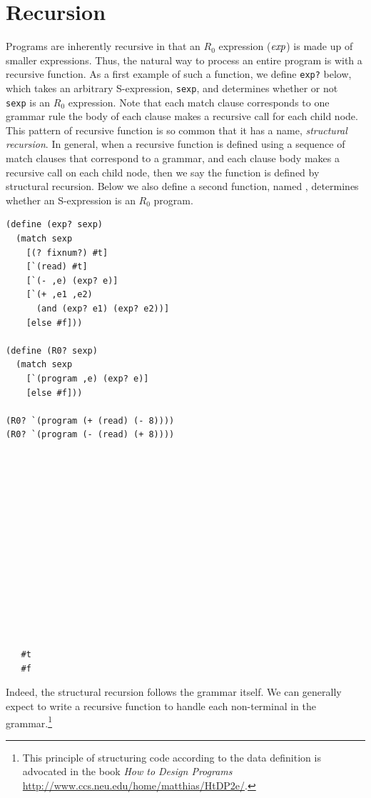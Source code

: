 \documentclass[11pt]{book}
\begin{document}
\section{Recursion}
\label{sec:recursion}

Programs are inherently recursive in that an $R_0$ expression ($\mathit{exp}$)
is made up of smaller expressions. Thus, the natural way to process an
entire program is with a recursive function.  As a first example of
such a function, we define \texttt{exp?} below, which takes an
arbitrary S-expression, {\tt sexp}, and determines whether or not {\tt
  sexp} is an $R_0$ expression. Note that each match clause
corresponds to one grammar rule the body of each clause makes a
recursive call for each child node. This pattern of recursive function
is so common that it has a name, \emph{structural recursion}.  In
general, when a recursive function is defined using a sequence of
match clauses that correspond to a grammar, and each clause body makes
a recursive call on each child node, then we say the function is
defined by structural recursion. Below we also define a second
function, named , determines whether an S-expression is an
$R_0$ program.
%
\begin{center}
\begin{minipage}{0.7\textwidth}
\begin{lstlisting}
(define (exp? sexp)
  (match sexp
    [(? fixnum?) #t]
    [`(read) #t]
    [`(- ,e) (exp? e)]
    [`(+ ,e1 ,e2)
      (and (exp? e1) (exp? e2))]
    [else #f]))

(define (R0? sexp)
  (match sexp
    [`(program ,e) (exp? e)]
    [else #f]))

(R0? `(program (+ (read) (- 8))))
(R0? `(program (- (read) (+ 8))))
\end{lstlisting}
\end{minipage}
\vrule
\begin{minipage}{0.25\textwidth}
\begin{lstlisting}














   #t
   #f
\end{lstlisting}
\end{minipage}
\end{center}

Indeed, the structural recursion follows the grammar itself.  We can
generally expect to write a recursive function to handle each
non-terminal in the grammar.\footnote{This principle of structuring
  code according to the data definition is advocated in the book
  \emph{How to Design Programs}
  \url{http://www.ccs.neu.edu/home/matthias/HtDP2e/}.}
\end{document}
